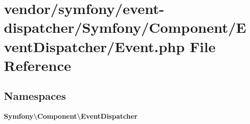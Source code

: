 \section{vendor/symfony/event-\/dispatcher/\+Symfony/\+Component/\+Event\+Dispatcher/\+Event.php File Reference}
\label{vendor_2symfony_2event-dispatcher_2_symfony_2_component_2_event_dispatcher_2_event_8php}
\subsection*{Namespaces}
\begin{DoxyCompactItemize}
\item 
 {\bf Symfony\textbackslash{}\+Component\textbackslash{}\+Event\+Dispatcher}
\end{DoxyCompactItemize}
